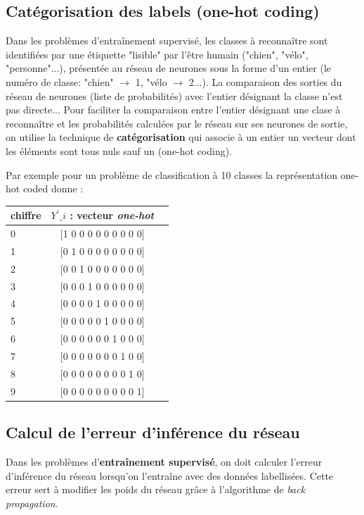 \documentclass{article}
\begin{document}
\subsection{Catégorisation des labels (\textbf{one-hot coding})}

Dans les problèmes d'entraînement supervisé, les classes à reconnaître sont identifiées
par une étiquette "lisible" par l'être humain ("chien", "vélo", "personne"...), 
présentée au réseau de neurones sous la forme d'un entier (le numéro de classe: "chien" $\rightarrow$ 1, "vélo $\rightarrow$ 2...). 
La comparaison des sorties du réseau de neurones (liste de probabilités) avec 
l'entier désignant la classe n'est pas directe... 
Pour faciliter la comparaison entre l'entier désignant une clase à reconnaître et les probabilités 
calculées par le réseau sur ses neurones de sortie, on utilise la technique de \textbf{catégorisation} qui associe 
à un entier un vecteur dont les éléments sont tous nuls sauf un (one-hot coding).



\newpage




Par exemple pour un problème de classification à 10 classes la représentation one-hot coded donne : \\


\begin{tabular}{|l|c|r|}
  \hline
  chiffre &  $Y^\prime\_i$ : vecteur \textit{one-hot} \\
  \hline
  0 & [1 0 0 0 0 0 0 0 0 0]\\
  1 & [0 1 0 0 0 0 0 0 0 0]\\
  2 & [0 0 1 0 0 0 0 0 0 0]\\
  3 & [0 0 0 1 0 0 0 0 0 0]\\
  4 & [0 0 0 0 1 0 0 0 0 0]\\
  5 & [0 0 0 0 0 1 0 0 0 0]\\
  6 & [0 0 0 0 0 0 1 0 0 0]\\
  7 & [0 0 0 0 0 0 0 1 0 0]\\
  8 & [0 0 0 0 0 0 0 0 1 0]\\
  9 & [0 0 0 0 0 0 0 0 0 1]\\
  \hline
\end{tabular}

\subsection{Calcul de l'erreur d'inférence du réseau}

Dans les problèmes d'\textbf{entraînement supervisé}, on doit calculer l'erreur d'inférence 
du réseau lorsqu'on l'entraîne avec des données labellisées. 
Cette erreur sert à modifier les poids du réseau grâce à l'algorithme de \textit{back propagation}. 
\end{document}
